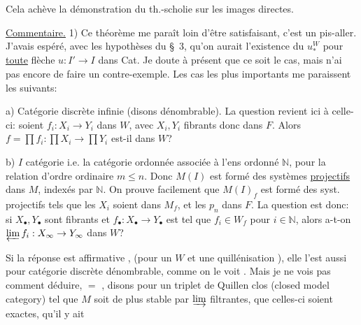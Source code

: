 Cela achève la démonstration du th.-scholie sur les images directes.

\uline{Commentaire.} 1) Ce théorème me paraît loin d'être satisfaisant, c'est un pis-aller. J'avais espéré, avec les hypothèses du \S\ 3, qu'on aurait l'existence du $u_*^W$ pour \uline{toute} flèche $u:I'\to I$ dans Cat. Je doute à présent que ce soit le cas, mais n'ai pas encore  de faire un contre-exemple. Les cas les plus importants  me paraissent les suivants:

a) Catégorie  discrète infinie (disons dénombrable). La question revient ici à celle-ci: soient $f_i:X_i\to Y_i$ dans $W$, avec $X_i,Y_i$ fibrants donc dans $F$. Alors $f=\prod f_i:\prod X_i\to\prod Y_i$ est-il dans $W$?

b) $I$ catégorie
i.e. la catégorie ordonnée associée à l'ens ordonné $\mathbb{N}$, pour la relation d'ordre ordinaire $m\leq n$. Donc $M(I)$ est formé des systèmes \uline{projectifs} dans $M$, indexés par $\mathbb{N}$.  On prouve facilement  que $M(I)_f$ est formé des syst. projectifs
tels que les $X_i$ soient dans $M_f$, et les $p_n$ dans $F$. La question est donc: si $X_\bullet,Y_\bullet$ sont fibrants et $f_\bullet:X_\bullet\to Y_\bullet$ est tel que $f_i\in W_f$ pour $i\in\mathbb{N}$, alors a-t-on $\varprojlim f_i:X_\infty\to Y_\infty$ dans $W$?

Si  la réponse est affirmative , (pour un $W$ et une quillénisation ), elle l'est aussi pour  catégorie discrète dénombrable, comme on le voit . Mais je ne vois pas comment déduire, $=$ , disons pour un triplet de Quillen clos (closed model category) tel que $M$ soit de plus stable par $\varinjlim$ filtrantes, que celles-ci soient exactes, qu'il y ait

